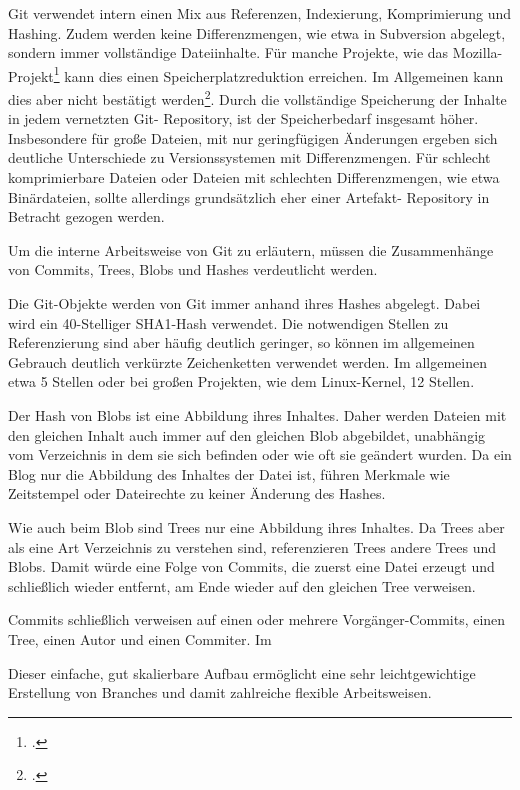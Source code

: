 Git verwendet intern einen Mix aus Referenzen, Indexierung, Komprimierung und Hashing. Zudem werden keine 
Differenzmengen, wie etwa in Subversion abgelegt, sondern immer vollständige Dateiinhalte. Für manche Projekte, wie das 
Mozilla-Projekt\footcite{kernel-git-svn} kann dies einen Speicherplatzreduktion erreichen. Im Allgemeinen kann dies aber 
nicht bestätigt werden\footcite{svn-vs-git}. Durch die vollständige Speicherung der Inhalte in jedem vernetzten Git-
Repository, ist der Speicherbedarf insgesamt höher. Insbesondere für große Dateien, mit nur geringfügigen Änderungen 
ergeben sich deutliche Unterschiede zu Versionssystemen mit Differenzmengen. Für schlecht komprimierbare Dateien oder 
Dateien mit schlechten Differenzmengen, wie etwa Binärdateien, sollte allerdings grundsätzlich eher einer Artefakt-
Repository in Betracht gezogen werden.

Um die interne Arbeitsweise von Git zu erläutern, müssen die Zusammenhänge von Commits, Trees, Blobs und Hashes 
verdeutlicht werden.

Die Git-Objekte werden von Git immer anhand ihres Hashes abgelegt. Dabei wird ein 40-Stelliger SHA1-Hash verwendet. Die 
notwendigen Stellen zu Referenzierung sind aber häufig deutlich geringer, so können im allgemeinen Gebrauch deutlich 
verkürzte Zeichenketten verwendet werden. Im allgemeinen etwa 5 Stellen oder bei großen Projekten, wie dem Linux-Kernel, 
12 Stellen.

Der Hash von Blobs ist eine Abbildung ihres Inhaltes. Daher werden Dateien mit den gleichen Inhalt auch immer auf den 
gleichen Blob abgebildet, unabhängig vom Verzeichnis in dem sie sich befinden oder wie oft sie geändert wurden. Da ein 
Blog nur die Abbildung des Inhaltes der Datei ist, führen Merkmale wie Zeitstempel oder Dateirechte zu keiner Änderung 
des Hashes.

Wie auch beim Blob sind Trees nur eine Abbildung ihres Inhaltes. Da Trees aber als eine Art Verzeichnis zu verstehen 
sind, referenzieren Trees andere Trees und Blobs. Damit würde eine Folge von Commits, die zuerst eine Datei erzeugt und 
schließlich wieder entfernt, am Ende wieder auf den gleichen Tree verweisen.

Commits schließlich verweisen auf einen oder mehrere Vorgänger-Commits, einen Tree, einen Autor und einen Commiter. Im 

Dieser einfache, gut skalierbare Aufbau ermöglicht eine sehr leichtgewichtige Erstellung von Branches und damit 
zahlreiche flexible Arbeitsweisen.

